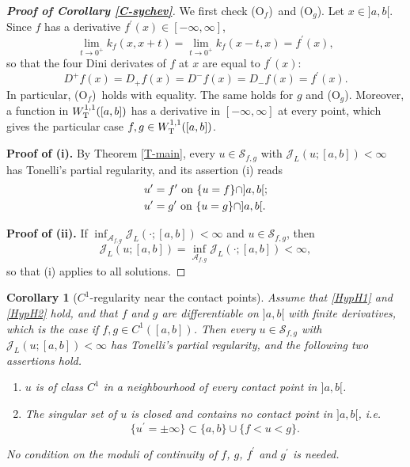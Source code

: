 \documentclass[reqno,12pt]{amsart}
\numberwithin{equation}{section}
\def\J{\mathcal{J}_L}
\def\A{\mathcal{A}_{f,g}}
\def\Sol{\mathcal{S}_{f,g}}
\def\Of{{\sf (O$_f$)}}
\def\Og{{\sf (O$_g$)}}
\newtheorem{corollary}[theorem]{Corollary}
\theoremstyle{remark}
\begin{document}
\begin{proof}[\bf Proof of Corollary \ref{C-sychev}]
We first check \Of\ and \Og. Let $x\in]a,b[$. Since $f$ has a derivative $f^\prime(x)\in[-\infty,\infty]$,
\begin{equation*}
\lim_{t\to0^+}k_f(x,x+t)=\lim_{t\to0^+}k_f(x-t,x)=f^\prime(x),
\end{equation*}
so that the four Dini derivates of $f$ at $x$ are equal to $f^\prime(x)$:
\begin{equation*}
D^+f(x)=D_+f(x)=D^-f(x)=D_-f(x)=f^\prime(x).
\end{equation*}
In particular, \Of\ holds with equality. The same holds for $g$ and \Og. Moreover, a function in $W^{1,1}_{\rm T}([a,b])$ has a derivative in $[-\infty,\infty]$ at every point, which gives the particular case $f,g\in W^{1,1}_{\rm T}([a,b])$.

\medskip

{\bf Proof of (i).} By Theorem \ref{T-main}, every $u\in\Sol$ with $\J(u;[a,b])<\infty$ has Tonelli's partial regularity, and its assertion (i) reads
\begin{align*}
&u^\prime=f^\prime\hbox{ on }\{u=f\}\cap]a,b[;\\
&u^\prime=g^\prime\hbox{ on }\{u=g\}\cap]a,b[.
\end{align*}

\medskip

{\bf Proof of (ii).} If $\inf_{\A}\J(\cdot;[a,b])<\infty$ and $u\in\Sol$, then
\begin{equation*}
\J(u;[a,b])=\inf_{\A}\J(\cdot;[a,b])<\infty,
\end{equation*}
so that {\rm(i)} applies to all solutions.
\end{proof}

\begin{corollary}[$C^1$-regularity near the contact points]\label{C-C1}
Assume that \ref{HypH1} and \ref{HypH2} hold, and that $f$ and $g$ are differentiable on $]a,b[$ with finite derivatives, which is the case if $f,g\in C^1([a,b])$. Then every $u\in\Sol$ with $\J(u;[a,b])<\infty$ has Tonelli's partial regularity, and the following two assertions hold.
\begin{enumerate}[leftmargin=3em, itemsep=0.8em, topsep=0.5em]
\item[{\rm(i)}] $u$ is of class $C^1$ in a neighbourhood of every contact point in $]a,b[$.
\item[{\rm(ii)}] The singular set of $u$ is closed and contains no contact point in $]a,b[$, i.e.
\begin{equation*}
\{u^\prime=\pm\infty\}\subset\{a,b\}\cup\{f<u<g\}.
\end{equation*}
\end{enumerate}
No condition on the moduli of continuity of $f$, $g$, $f^\prime$ and $g^\prime$ is needed.
\end{corollary}
\end{document}

